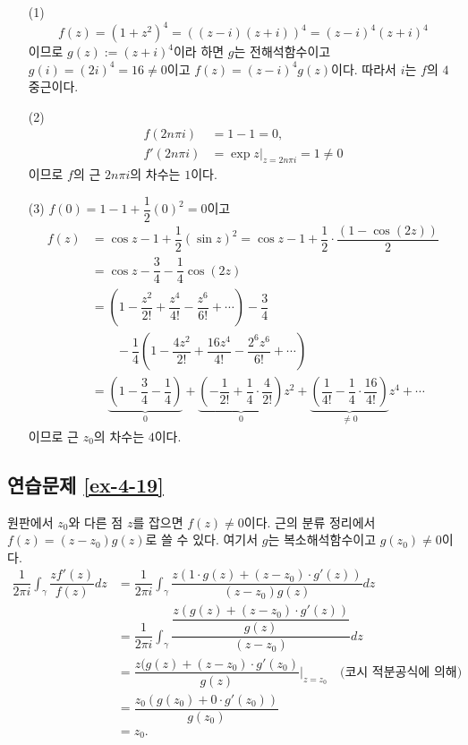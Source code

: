 \begin{itemize}
\item[(1)] 
\[f(z) = (1+z^2)^4 = ((z-i)(z+i))^4
= (z-i)^4(z+i)^4
\]
이므로 $g(z):= (z+i)^4$이라 하면
$g$는 전해석함수이고 $g(i) = (2i)^4 = 16\ne 0$이고
$f(z) = (z-i)^4 g(z)$이다. 
따라서 $i$는 $f$의 $4$ 중근이다.
\item[(2)] 
\begin{align*}
f(2n\pi i) &= 1 - 1 = 0, \\
f'(2n\pi i) &= \exp z \Big|_{z=2n\pi i} = 1 \ne 0
\end{align*}
이므로  $f$의 근 $2n\pi i$의 차수는 $1$이다.
\item[(3)] $f(0)  = 1 - 1 + \dfrac12(0)^2 = 0$이고
\begin{align*}
f(z) &= \cos z - 1 + \dfrac12(\sin z)^2 = \cos z - 1 + \dfrac12 \cdot \dfrac{(1-\cos(2z))}2 \\
&= \cos z - \dfrac34 - \dfrac14\cos(2z) \\
&= \left( 1 - \dfrac{z^2}{2!} + \dfrac{z^4}{4!} - \dfrac{z^6}{6!} + \cdots \right)- \dfrac 34 \\
& \qquad -\dfrac14\left( 1 - \dfrac{4z^2}{2!} + \dfrac{16z^4}{4!} 
- \dfrac{2^6z^6}{6!} + \cdots \right) \\
&= \underbrace{\left(1-\dfrac34-\dfrac14\right)}_{0}
+ \underbrace{\left(-\dfrac1{2!} +\dfrac14\cdot\dfrac 4{2!}\right)}_{0} z^2
+ \underbrace{\left(\dfrac1{4!} - \dfrac14\cdot\dfrac {16}{4!}\right)}_{\ne 0} z^4 + \cdots
\end{align*}
이므로 근 $z_0$의 차수는 $4$이다.
\end{itemize}

\subsection*{연습문제 \ref{ex-4-19}}

원판에서 $z_0$와 다른 점 $z$를 잡으면 $f(z)\ne0$이다.
근의 분류 정리에서 $f(z)=(z-z_0)g(z)$로 쓸 수 있다.
여기서 $g$는 복소해석함수이고 $g(z_0)\ne0$이다.
\begin{align*}
\dfrac1{2\pi i}\int_\gamma \dfrac{zf'(z)}{f(z)}dz 
&= \dfrac1{2\pi i}\int_\gamma \dfrac{z(1\cdot g(z) + (z-z_0)\cdot g'(z))}{(z-z_0)g(z)}dz  \\
&= \dfrac1{2\pi i}\int_\gamma \dfrac{\dfrac{z(g(z) + (z-z_0)\cdot g'(z))}{g(z)}}{(z-z_0)}dz  \\
&= \dfrac{z(g(z) + (z-z_0)\cdot g'(z_0)}{g(z)}\Big|_{z=z_0} 
\quad\text{(코시 적분공식에 의해)} \\
&= \dfrac{z_0(g(z_0) + 0\cdot g'(z_0))}{g(z_0)} \\
&= z_0.
\end{align*}

